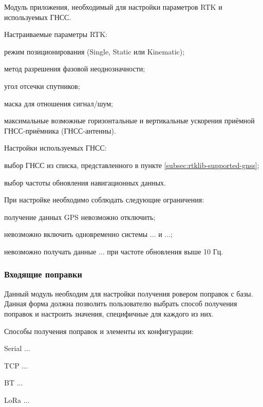 Модуль приложения, необходимый для настройки параметров RTK и используемых ГНСС.

Настраиваемые параметры RTK:
\begin{dashitemize}
  \item режим позиционирования (Single, Static или Kinematic);
  \item метод разрешения фазовой неоднозначности;
  \item угол отсечки спутников;
  \item маска для отношения сигнал/шум;
  \item максимальные возможные горизонтальные и вертикальные ускорения приёмной ГНСС-приёмника (ГНСС-антенны).
\end{dashitemize}

Настройки используемых ГНСС:
\begin{dashitemize}
  \item выбор ГНСС из списка, представленного в пункте \ref{subsec:rtklib-supported-gnss};
  \item выбор частоты обновления навигационных данных.
\end{dashitemize}

При настройке необходимо соблюдать следующие ограничения:
\begin{dashitemize}
  \item получение данных GPS невозможно отключить;
  \item невозможно включить одновременно системы ... и ...;
  \item невозможно получать данные ... при частоте обновления выше 10 Гц.
\end{dashitemize}

\subsubsection{Входящие поправки}

Данный модуль необходим для настройки получения ровером поправок с базы. Данная форма должна позволить пользователю выбрать способ получения поправок и настроить значения, специфичные для каждого из них.

Способы получения поправок и элементы их конфигурации:
\begin{dashitemize}
  \item Serial ...
  \item TCP ...
  \item BT ...
  \item LoRa ...
\end{dashitemize}

